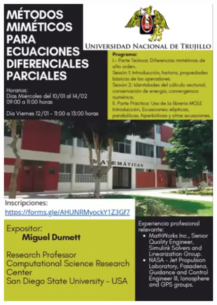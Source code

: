\begin{figure}[ht!]
	\centering
	\includegraphics[width=.32\paperwidth]{mole2024}\quad

\end{figure}
